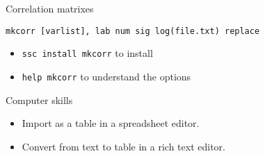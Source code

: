 \documentclass[t]{beamer}
\begin{document}

  \begin{frame}[c]{Correlation matrixes}
	
		\begin{block}{\texttt{mkcorr [varlist], lab num sig log(file.txt) replace}}
			\begin{itemize}
				\item \texttt{ssc install mkcorr} to install
				\item \texttt{help mkcorr} to understand the options
			\end{itemize}
		\end{block}
	
		\begin{alertblock}{Computer skills}
			\begin{itemize}
				\item Import as a table in a spreadsheet editor.
				\item Convert from text to table in a rich text editor.
			\end{itemize}
			  
		\end{alertblock}

	\end{frame}
		
\end{document}
